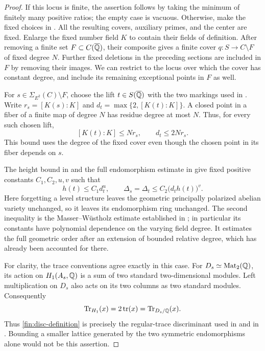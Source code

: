\begin{proof}
If this locus is finite, the assertion follows by taking the minimum
of finitely many positive ratios; the empty case is vacuous.
Otherwise, make the fixed choices in .
All the resulting covers, auxiliary primes, and the center are fixed.
Enlarge the fixed number field $K$ to contain their fields of definition.
After removing a finite set $F\subset C(\overline{\mathbb Q})$, their composite gives
a finite cover $q:S\longrightarrow C\setminus F$ of fixed degree $N$.
Further fixed deletions in the preceding sections are included in $F$
by removing their images.  We can restrict to the locus over which the
cover has constant degree, and include its remaining exceptional points
in $F$ as well.

For $s\in\Sigma_{E^2}(C)\setminus F$, choose the lift $t\in S(\overline{\mathbb Q})$
with the two markings used in .  Write
$r_s=[K(s):K]$ and $d_t=\max\{2,[K(t):K]\}$.
A closed point in a fiber of a finite map of degree $N$ has residue
degree at most $N$.  Thus, for every such chosen lift,
\begin{equation}\label{fin:degree-descent}
 [K(t):K]\leq N r_s,\qquad d_t\leq 2N r_s.
\end{equation}
This bound uses the degree of the fixed cover even though the chosen
point in its fiber depends on $s$.

The height bound in  and the full endomorphism estimate
in  give fixed positive constants $C_1,C_2,u,v$
such that
\begin{equation}\label{fin:height-to-disc}
 h(t)\leq C_1 d_t^u,\qquad
 \Delta_s=\Delta_t\leq C_2\bigl(d_t h(t)\bigr)^v.
\end{equation}
Here forgetting a level structure leaves the geometric principally
polarized abelian variety unchanged, so it leaves its endomorphism
ring unchanged.  The second inequality is the Masser--W\"ustholz
estimate established in ; in particular its
constants have polynomial dependence on the varying field degree.
It estimates the full geometric order after an extension of bounded
relative degree, which has already been accounted for there.

For clarity, the trace conventions agree exactly in this case.
For $D_s\simeq\operatorname{Mat}_2(\mathbb Q)$, its action on $H_1(A_s,\mathbb Q)$ is a sum of
two standard two-dimensional modules.  Left multiplication on $D_s$
also acts on its two columns as two standard modules.  Consequently
\begin{equation}\label{fin:trace-normalization}
 \operatorname{Tr}_{H_1}(x)=2\operatorname{tr}(x)=\operatorname{Tr}_{D_s/\mathbb Q}(x).
\end{equation}
Thus \eqref{fin:disc-definition} is precisely the regular-trace
discriminant used in  and in
\cite[\S\S3.1 and 5.4]{DawOrr2022}. Bounding a smaller lattice generated by
the two symmetric endomorphisms alone would not be this assertion.


\end{proof}
